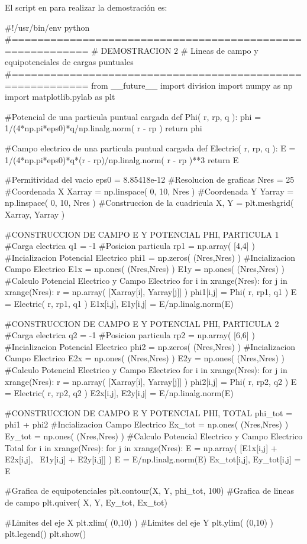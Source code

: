 El script en \python para realizar la demostración es:

\begin{listing}[style=python]
#!/usr/bin/env python
#==========================================================
# DEMOSTRACION 2
# Lineas de campo y equipotenciales de cargas puntuales
#==========================================================
from __future__ import division
import numpy as np
import matplotlib.pylab as plt

#Potencial de una particula puntual cargada
def Phi( r, rp, q ):
    phi = 1/(4*np.pi*eps0)*q/np.linalg.norm( r - rp )
    return phi

#Campo electrico de una particula puntual cargada
def Electric( r, rp, q ):
    E = 1/(4*np.pi*eps0)*q*(r - rp)/np.linalg.norm( r - rp )**3
    return E

#Permitividad del vacio
eps0 = 8.85418e-12
#Resolucion de graficas
Nres = 25
#Coordenada X
Xarray = np.linspace( 0, 10, Nres )
#Coordenada Y
Yarray = np.linspace( 0, 10, Nres )
#Construccion de la cuadricula
X, Y = plt.meshgrid( Xarray, Yarray )

#CONSTRUCCION DE CAMPO E Y POTENCIAL PHI, PARTICULA 1
#Carga electrica
q1 = -1
#Posicion particula
rp1 = np.array( [4,4] )
#Incializacion Potencial Electrico
phi1 = np.zeros( (Nres,Nres) )
#Incializacion Campo Electrico
E1x = np.ones( (Nres,Nres) )
E1y = np.ones( (Nres,Nres) )
#Calculo Potencial Electrico y Campo Electrico
for i in xrange(Nres):
    for j in xrange(Nres):
	r = np.array( [Xarray[i], Yarray[j]] )
	phi1[i,j] = Phi( r, rp1, q1 )
	E = Electric( r, rp1, q1 )
	E1x[i,j], E1y[i,j] = E/np.linalg.norm(E)

#CONSTRUCCION DE CAMPO E Y POTENCIAL PHI, PARTICULA 2
#Carga electrica
q2 = -1
#Posicion particula
rp2 = np.array( [6,6] )
#Incializacion Potencial Electrico
phi2 = np.zeros( (Nres,Nres) )
#Incializacion Campo Electrico
E2x = np.ones( (Nres,Nres) )
E2y = np.ones( (Nres,Nres) )
#Calculo Potencial Electrico y Campo Electrico
for i in xrange(Nres):
    for j in xrange(Nres):
	r = np.array( [Xarray[i], Yarray[j]] )
	phi2[i,j] = Phi( r, rp2, q2 )
	E = Electric( r, rp2, q2 )
	E2x[i,j], E2y[i,j] = E/np.linalg.norm(E)

#CONSTRUCCION DE CAMPO E Y POTENCIAL PHI, TOTAL
phi_tot = phi1 + phi2
#Incializacion Campo Electrico
Ex_tot = np.ones( (Nres,Nres) )
Ey_tot = np.ones( (Nres,Nres) )
#Calculo Potencial Electrico y Campo Electrico Total
for i in xrange(Nres):
    for j in xrange(Nres):
	E = np.array( [E1x[i,j] + E2x[i,j], \
	E1y[i,j] + E2y[i,j]] )
	E = E/np.linalg.norm(E)
	Ex_tot[i,j], Ey_tot[i,j] = E 

#Grafica de equipotenciales
plt.contour(X, Y, phi_tot, 100)
#Grafica de lineas de campo
plt.quiver( X, Y, Ey_tot, Ex_tot)

#Limites del eje X
plt.xlim( (0,10) )
#Limites del eje Y
plt.ylim( (0,10) )
plt.legend()
plt.show()
\end{listing}


